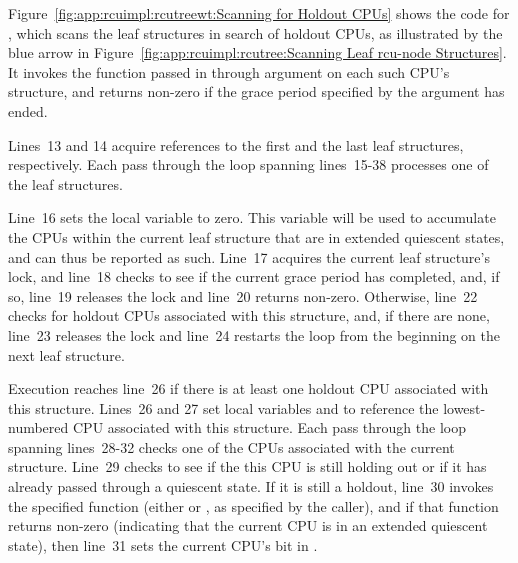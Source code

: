 \begin{figure*}[tb]
\centering
{}
\caption{Scanning Leaf {\tt rcu\_node} Structures}
\label{fig:app:rcuimpl:rcutree:Scanning Leaf rcu-node Structures}
\end{figure*}

Figure~\ref{fig:app:rcuimpl:rcutreewt:Scanning for Holdout CPUs}
shows the code for , which scans the
leaf  structures in search of holdout CPUs,
as illustrated by the blue arrow in
Figure~\ref{fig:app:rcuimpl:rcutree:Scanning Leaf rcu-node Structures}.
It invokes the function passed in through argument  on each
such CPU's  structure, and returns non-zero if
the grace period specified by the  argument has ended.

Lines~13 and 14 acquire references to the first and the last leaf
 structures, respectively.
Each pass through the loop spanning lines~15-38 processes one of
the leaf  structures.

Line~16 sets the local variable  to zero.
This variable will be used to accumulate the CPUs within the current
leaf  structure that are in extended quiescent states, and
can thus be reported as such.
Line~17 acquires the current leaf  structure's lock,
and line~18 checks to see if the current grace period has completed,
and, if so, line~19 releases the lock and line~20 returns non-zero.
Otherwise, line~22 checks for holdout CPUs associated with this
 structure, and, if there are none, line~23 releases
the lock and line~24 restarts the loop from the beginning on the
next leaf  structure.

Execution reaches line~26 if there is at least one holdout CPU associated
with this  structure.
Lines~26 and 27 set local variables  and  to reference
the lowest-numbered CPU associated with this  structure.
Each pass through the loop spanning lines~28-32 checks one of the
CPUs associated with the current  structure.
Line~29 checks to see if the this CPU is still holding out or if
it has already passed through a quiescent state.
If it is still a holdout, line~30 invokes the specified function
(either  or
, as specified by the caller), and
if that function returns non-zero (indicating that the current CPU
is in an extended quiescent state), then line~31 sets the current
CPU's bit in .

